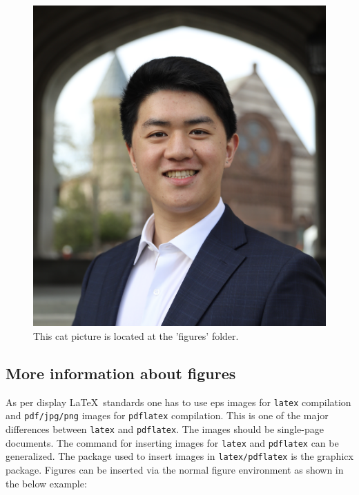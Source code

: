 \documentclass[12pt,a4paper]{article}
\begin{document}
\begin{figure}[!ht]
\centering
\includegraphics[width=0.4\linewidth]{figures/cat_momo_1.png}
\caption{\label{fig:cat1}This cat picture is located at the 'figures' folder.}
\end{figure}

\subsection{More information about figures}

As per display \LaTeX\ standards one has to use eps images for \verb+latex+ compilation and \verb+pdf/jpg/png+ images for
\verb+pdflatex+ compilation. This is one of the major differences between \verb+latex+
and \verb+pdflatex+. The images should be single-page documents. The command for inserting images
for \verb+latex+ and \verb+pdflatex+ can be generalized. The package used to insert images in \verb+latex/pdflatex+ is the
graphicx package. Figures can be inserted via the normal figure environment as shown in the below example:
\end{document}
